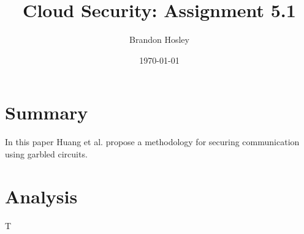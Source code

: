 \documentclass[]{article}
\title{Cloud Security: Assignment 5.1}
\author{Brandon Hosley}
\date{\today}
\begin{document}
	\maketitle
	
\section{Summary} 

In this paper\cite{Huang2011} Huang et al. propose a methodology for securing communication using garbled circuits.

\section{Analysis}

T


\clearpage


\end{document}

